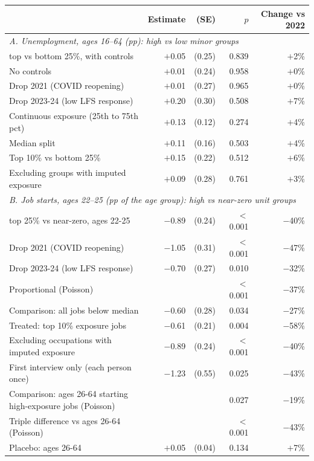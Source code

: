 \begin{tabular}{lrrrr}
\toprule
 & Estimate & (SE) & $p$ & Change vs 2022 \\
\midrule
\multicolumn{5}{l}{\emph{A. Unemployment, ages 16--64 (pp): high vs low minor groups}}\\
\quad top vs bottom 25\%, with controls & \ensuremath{+}0.05 & (0.25) & 0.839 & \ensuremath{+}2\% \\
\quad No controls & \ensuremath{+}0.01 & (0.24) & 0.958 & \ensuremath{+}0\% \\
\quad Drop 2021 (COVID reopening) & \ensuremath{+}0.01 & (0.27) & 0.965 & \ensuremath{+}0\% \\
\quad Drop 2023-24 (low LFS response) & \ensuremath{+}0.20 & (0.30) & 0.508 & \ensuremath{+}7\% \\
\quad Continuous exposure (25th to 75th pct) & \ensuremath{+}0.13 & (0.12) & 0.274 & \ensuremath{+}4\% \\
\quad Median split & \ensuremath{+}0.11 & (0.16) & 0.503 & \ensuremath{+}4\% \\
\quad Top 10\% vs bottom 25\% & \ensuremath{+}0.15 & (0.22) & 0.512 & \ensuremath{+}6\% \\
\quad Excluding groups with imputed exposure & \ensuremath{+}0.09 & (0.28) & 0.761 & \ensuremath{+}3\% \\
\midrule
\multicolumn{5}{l}{\emph{B. Job starts, ages 22--25 (pp of the age group): high vs near-zero unit groups}}\\
\quad top 25\% vs near-zero, ages 22-25 & \ensuremath{-}0.89 & (0.24) & $<$0.001 & \ensuremath{-}40\% \\
\quad Drop 2021 (COVID reopening) & \ensuremath{-}1.05 & (0.31) & $<$0.001 & \ensuremath{-}47\% \\
\quad Drop 2023-24 (low LFS response) & \ensuremath{-}0.70 & (0.27) & 0.010 & \ensuremath{-}32\% \\
\quad Proportional (Poisson) &  &  & $<$0.001 & \ensuremath{-}37\% \\
\quad Comparison: all jobs below median & \ensuremath{-}0.60 & (0.28) & 0.034 & \ensuremath{-}27\% \\
\quad Treated: top 10\% exposure jobs & \ensuremath{-}0.61 & (0.21) & 0.004 & \ensuremath{-}58\% \\
\quad Excluding occupations with imputed exposure & \ensuremath{-}0.89 & (0.24) & $<$0.001 & \ensuremath{-}40\% \\
\quad First interview only (each person once) & \ensuremath{-}1.23 & (0.55) & 0.025 & \ensuremath{-}43\% \\
\quad Comparison: ages 26-64 starting high-exposure jobs (Poisson) &  &  & 0.027 & \ensuremath{-}19\% \\
\quad Triple difference vs ages 26-64 (Poisson) &  &  & $<$0.001 & \ensuremath{-}43\% \\
\quad Placebo: ages 26-64 & \ensuremath{+}0.05 & (0.04) & 0.134 & \ensuremath{+}7\% \\
\bottomrule
\end{tabular}
